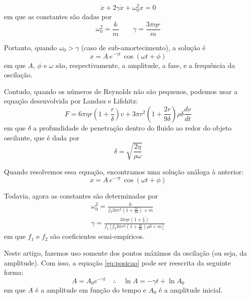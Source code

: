 \documentclass[a4paper, 12pt]{article}
\begin{document}
\begin{multicols}{2}
			\begin{equation}
				\ddot{x} + 2 \gamma \dot{x} + \omega_0^2 x = 0
			\end{equation}
			em que as constantes são dadas por
			\begin{equation}
				\omega_0^2 = \frac{k}{m} \qquad \gamma = \frac{3 \pi \eta r}{m}
			\end{equation}
			\par Portanto, quando $\omega_0 > \gamma$ (caso de sub-amortecimento), a solução é
			\begin{equation}
				x = A \, e^{- \gamma t} \, \cos (\omega t + \phi)
			\end{equation}
			em que $A$, $\phi$ e $\omega$ são, respectivamente, a amplitude, a fase, e a frequência da oscilação.
			\par Contudo, quando os números de Reynolds não são pequenos, podemos usar a equação desenvolvida por Landau e Lifshitz:
			\small \begin{equation} \label{eq:landau}
				F = 6 \pi \eta r \left(1 + \frac{r}{\delta} \right) v + 3 \pi r^2 \left( 1 + \frac{2 r}{9 \delta} \right) \rho \delta \dfrac{d v}{d t}
			\end{equation} \normalsize
			em que $\delta$ a profundidade de penetração dentro do fluido ao redor do objeto oscilante, que é dada por
			\begin{equation}
				\delta = \sqrt{\frac{2 \eta}{\rho \omega}}
			\end{equation}
			\par Quando resolvemos essa equação, encontramos uma solução análoga à anterior:
			\begin{equation} \label{eq:posicao}
				x = A \, e^{- \gamma t} \, \cos (\omega t + \phi)
			\end{equation}
			\par Todavia, agora as constantes são determinadas por
			\begin{equation} \label{eq:constantes} \begin{split}
				\omega_0^2 = \frac{k}{f_2 3 \pi r^2 \left(1 + \frac{2 r}{9 \delta} \right) + m} \\
				\gamma = \frac{3 \pi \eta r \left(1+ \frac{r}{\delta} \right)}{f_1 \left[ f_2 3 \pi r^2 \left(1+\frac{2 r}{9 \delta} \right) \rho \delta + m \right]}
			\end{split} \end{equation}
			em que $f_1$ e $f_2$ são coeficientes semi-empíricos.
			\par Neste artigo, fazemos uso somente dos pontos máximos da oscilação (ou seja, da amplitude). Com isso, a equação \hyperref[eq:posicao]{\ref{eq:posicao}} pode ser reescrita da seguinte forma:
			\begin{equation}
				A = A_0 e^{- \gamma t} \quad \therefore \quad \ln A = - \gamma t + \ln A_0
			\end{equation}
			em que $A$ é a amplitude em função do tempo e $A_0$ é a amplitude inicial.
			

\end{multicols}
\end{document}
